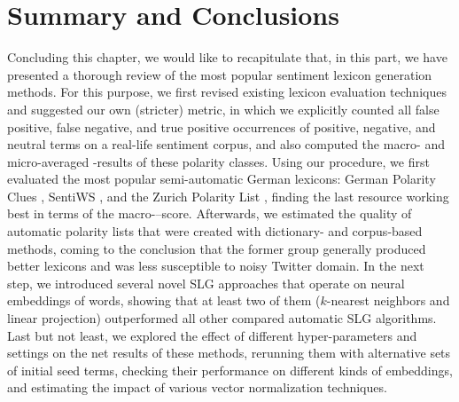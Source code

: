\section{Summary and Conclusions}

Concluding this chapter, we would like to recapitulate that, in this
part, we have presented a thorough review of the most popular
sentiment lexicon generation methods.  For this purpose, we first
revised existing lexicon evaluation techniques and suggested our own
(stricter) metric, in which we explicitly counted all false positive,
false negative, and true positive occurrences of positive, negative,
and neutral terms on a real-life sentiment corpus, and also computed
the macro- and micro-averaged \F-results of these polarity classes.
Using our procedure, we first evaluated the most popular
semi-automatic German lexicons: German Polarity Clues
\cite{Waltinger:10}, SentiWS \cite{Remus:10}, and the Zurich Polarity
List \cite{Clematide:10}, finding the last resource working best in
terms of the macro-\F--score.  Afterwards, we estimated the quality of
automatic polarity lists that were created with dictionary- and
corpus-based methods, coming to the conclusion that the former group
generally produced better lexicons and was less susceptible to noisy
Twitter domain.  In the next step, we introduced several novel SLG
approaches that operate on neural embeddings of words, showing that at
least two of them ($k$-nearest neighbors and linear projection)
outperformed all other compared automatic SLG algorithms.  Last but
not least, we explored the effect of different hyper-parameters and
settings on the net results of these methods, rerunning them with
alternative sets of initial seed terms, checking their performance on
different kinds of embeddings, and estimating the impact of various
vector normalization techniques.

